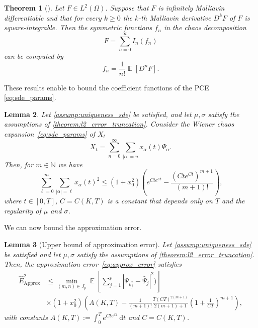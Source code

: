 \documentclass[12pt]{article}
\newtheorem{theorem}{Theorem}[section]
\newtheorem{lemma}[theorem]{Lemma}
\theoremstyle{remark}
\theoremstyle{plain}
\numberwithin{equation}{section}
\newcommand{\dd}{\ensuremath{\,\mathrm d}}
\DeclareMathOperator{\E}{\mathbb E}
\begin{document}
\begin{theorem}[{\cite{Stroock1987}}]\label{theorem:kernel_stroock}
    Let $F \in L^2(\Omega)$. Suppose that $F$ is \emph{infinitely Malliavin differentiable} and that for every $k \geq 0$ the \emph{$k$-th Malliavin derivative $D^k F$ of $F$ is square-integrable}. Then the symmetric functions $f_n$ in the chaos decomposition
    \begin{equation*}
        F = \sum_{n=0}^\infty I_n(f_n)
    \end{equation*}
    can be computed by
    \begin{equation*}
        f_n = \frac{1}{n!} \E[D^n F].
    \end{equation*}
\end{theorem}

These results enable to bound the coefficient functions of the PCE \cref{eq:sde_params}.
\begin{lemma}\label{lemma:decay_squared_coef}
    Let \cref{assump:uniqueness_sde} be satisfied, and let $\mu,\sigma$ satisfy the assumptions of \cref{theorem:l2_error_truncation}.
    Consider the Wiener chaos expansion~\cref{eq:sde_params} of $X_t$
    \begin{equation*}
        X_t = \sum_{n=0}^\infty \sum_{|\alpha|=n} x_\alpha(t) \Psi_\alpha.
    \end{equation*}
    Then, for $m \in \mathbb N$ we have
    \begin{equation*}
        \sum_{\ell = 0}^m \sum_{|\alpha|=\ell} x_\alpha(t)^2 \leq (1+x_0^2)\left(e^{Ct e^{Ct}} - \frac{(Cte^{Ct})^{m+1}}{(m+1)!}\right),
    \end{equation*}
    where $t \in [0, T]$, $C = C(K, T)$ is a constant that depends only on $T$ and the regularity of $\mu$ and $\sigma$.
\end{lemma}

We can now bound the approximation error.
\begin{lemma}[{Upper bound of approximation error}]\label{lemma:ub_approx_error}
    Let \cref{assump:uniqueness_sde} be satisfied and let $\mu,\sigma$ satisfy the assumptions of \cref{theorem:l2_error_truncation}.
    Then, the \emph{approximation error}~\cref{eq:approx_error} satisfies
    \begin{align*}
        \hat E_\text{Approx}^2 &\leq \min_{(m,n) \in J_p} \E\left[\sum_{j=1}^p |\Psi_{k_j^*}-\widetilde{\Psi_j}|^2)\right]\\ &\times (1+x_0^2)\left(A(K,T) - \frac{1}{(m+1)!}\frac{T(CT)^{2(m+1)}}{2(m+1)+1}\left(1+\frac{1}{CT}\right)^{m+1}\right),
    \end{align*}
    with constants $A(K,T):=\int_0^T e^{Cte^{Ct}} \dd t$ and $C=C(K,T)$.
\end{lemma}
\end{document}
